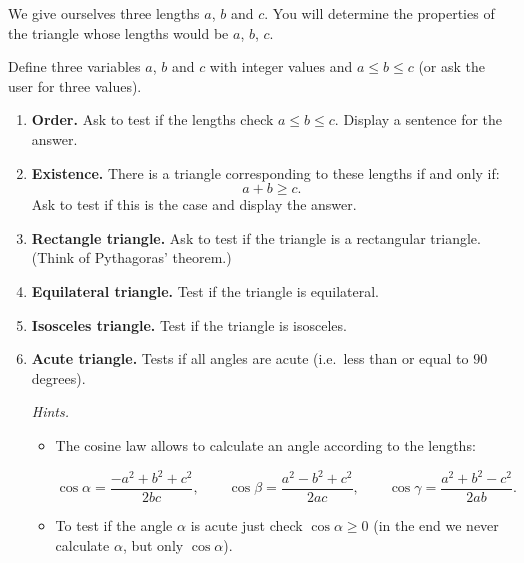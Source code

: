 \documentclass[11pt,class=report,crop=false]{standalone}
\begin{document}
\begin{activite}[Triangles]


We give ourselves three lengths $a$, $b$ and $c$. You will determine the properties of the triangle whose lengths would be $a$, $b$, $c$.



Define three variables $a$, $b$ and $c$ with integer values and $a \le b \le c$ (or ask the user for three values).

\begin{enumerate}
  \item \textbf{Order.} Ask \Python{} to test if the lengths check $a \le b \le c$. Display a sentence for the answer.
  
  \item \textbf{Existence.} There is a triangle corresponding to these lengths if and only if:
  $$a + b \ge c.$$
  Ask \Python{} to test if this is the case and display the answer.
  
  
  \item \textbf{Rectangle triangle.} Ask \Python{} to test if the triangle is a rectangular triangle. (Think of Pythagoras' theorem.)
  
   \item \textbf{Equilateral triangle.} Test if the triangle is equilateral. 
   
   \item \textbf{Isosceles triangle.} Test if the triangle is isosceles.   
   
   \item \textbf{Acute triangle.} Tests if all angles are acute (i.e.~less than or equal to $90$ degrees).
   
    \emph{Hints.} 
    \begin{itemize}
      \item The cosine law allows to calculate an angle according to the lengths:
      
   
   $$\cos \alpha = \frac{-a^2+b^2+c^2}{2bc},
   \qquad
   \cos \beta = \frac{a^2-b^2+c^2}{2ac},
   \qquad
   \cos \gamma = \frac{a^2+b^2-c^2}{2ab}.$$   

   \smallskip
   
    \item To test if the angle $\alpha$ is acute just check $\cos \alpha \ge 0$ (in the end we never calculate $\alpha$, but only $\cos \alpha$).
   
   \end{itemize} 
   
\end{enumerate}   
     
    \smallskip 
     
    
\end{activite}
\end{document}
